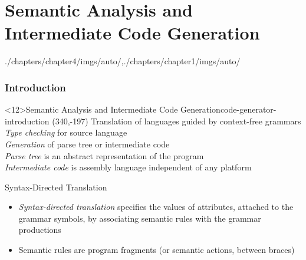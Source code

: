 \part[author={\protect\insertauthor},label={chap:intermediate_code_generation}]{Semantic Analysis and Intermediate Code Generation}

\begin{graphicspathcontext}{{./chapters/chapter4/imgs/auto/},{./chapters/chapter1/imgs/auto/}}
	\begin{bibunit}[apalike]

\tableofcontentslide

\section{Introduction}
\sectiontableofcontentslide

\begin{rightlawnframe}<12>{{Semantic Analysis} and Intermediate Code Generation}{code-generator-introduction}
	\putat*(340,-197){}
	Translation of languages guided by context-free grammars \\[.2cm]
	\emph{Type checking} for source language \\[.2cm]
	\emph{Generation} of parse tree or intermediate code \\[.2cm]
	\emph{Parse tree} is an abstract representation of the program \\[.2cm]
	\emph{Intermediate code} is assembly language independent of any platform
\end{rightlawnframe}

\begin{frame}{Syntax-Directed Translation}
	\begin{itemize}
	\item \emph{Syntax-directed translation} specifies the values of attributes, attached to the grammar symbols, by associating semantic rules with the grammar productions \\[.2cm]
		\begin{sdd}
		\sdddots
		\end{sdd}
	\vspace{1em}
	\item Semantic rules are program fragments (or semantic actions, between braces)
	\end{itemize}
\end{frame}


\end{bibunit}
\end{graphicspathcontext}
